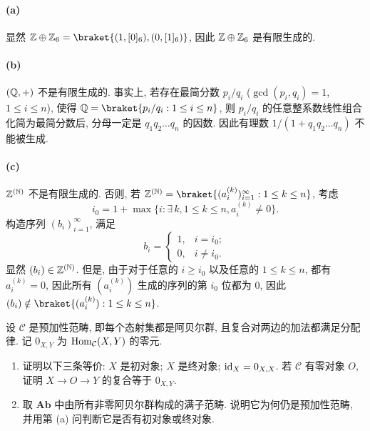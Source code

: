 \documentclass{article}
\begin{document}
\begin{solution}
	\paragraph{(a)} 显然 $\Z \oplus \Z_6 = \braket{(1,[0]_6), (0, [1]_6)}$, 因此 $\mathbb{Z} \oplus \mathbb{Z}_6$ 是有限生成的.

	\paragraph{(b)} $(\mathbb{Q}, +)$ 不是有限生成的. 事实上, 若存在最简分数 $p_i/q_i$ ($\gcd(p_i, q_i) = 1$, $1 \le i \le n$), 使得 $\Q = \braket{p_i/q_i: 1 \le i \le n}$, 则 $p_i/q_i$ 的任意整系数线性组合化简为最简分数后, 分母一定是 $q_1q_2 \dots q_n$ 的因数. 因此有理数 $1/(1 + q_1q_2 \dots q_n)$ 不能被生成.

	\paragraph{(c)} $\mathbb{Z}^{(\mathbb{N})}$ 不是有限生成的. 否则, 若 $\Z^{(\N)} = \braket{(a_i^{(k)})_{i=1}^{\infty}: 1 \le k \le n	}$, 考虑
	\[ i_0 = 1 + \max\{i: \exists\,k, 1 \le k \le n, a_i^{(k)} \neq 0\}. \]
	构造序列 $(b_i)_{i = 1}^{\infty}$, 满足
	\[ b_i = \begin{cases}
		1, & i = i_0; \\
		0, & i \neq i_0.
	\end{cases} \]
	显然 $(b_i) \in \mathbb{Z}^{(\mathbb{N})}$. 但是, 由于对于任意的 $i \ge i_0$ 以及任意的 $1 \le k \le n$, 都有 $a_i^{(k)} = 0$, 因此所有 $(a_i^{(k)})$ 生成的序列的第 $i_0$ 位都为 $0$, 因此 $(b_i) \notin \braket{(a_i^{(k)}): 1 \le k \le n}$.
\end{solution}



\begin{problem}
设 $\mathcal C$ 是预加性范畴, 即每个态射集都是阿贝尔群, 且复合对两边的加法都满足分配律. 记 $0_{X,Y}$ 为 $\operatorname{Hom}_{\mathcal C}(X,Y)$ 的零元.
\begin{enumerate}
  \item[(a)] 证明以下三条等价: $X$ 是初对象; $X$ 是终对象; $\operatorname{id}_X=0_{X,X}$. 若 $\mathcal C$ 有零对象 $O$, 证明 $X\to O\to Y$ 的复合等于 $0_{X,Y}$.
  \item[(b)] 取 $\mathbf{Ab}$ 中由所有非零阿贝尔群构成的满子范畴. 说明它为何仍是预加性范畴, 并用第 (a) 问判断它是否有初对象或终对象.
\end{enumerate}
\end{problem}
\end{document}
